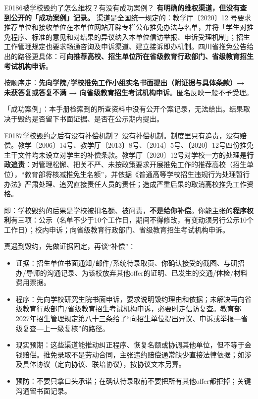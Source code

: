 \begin{qa}{E0186}{被学校毁约了怎么维权？有没有成功案例？}
\textbf{有明确的维权渠道，但没有查到公开的「成功案例」记录。}
渠道是全国统一规定的：教学厅〔2020〕12 号要求推荐单位和接收单位在本单位网站开辟专栏公布推免办法与名单，并将「学生对推免程序、标准的意见和对结果的异议纳入本单位信访举报、申诉受理机制」；招生工作管理规定也要求畅通咨询及申诉渠道、建立接诉即办机制。四川省推免公告给出的路径更具体：可\textbf{向推荐高校、招生单位所在省级教育行政部门、省级教育招生考试机构申诉}。

按顺序走：\textbf{先向学院/学校推免工作小组实名书面提出（附证据与具体条款）→ 未获答复或答复不满 → 向省级教育招生考试机构申诉}。匿名反映一般不予受理。

「成功案例」：本手册检索到的所查资料中没有公开个案记录，无法给出。结果取决于毁约是否留下书面证据、是否在公示期内提出。
\end{qa}

\begin{qa}{E0187}{学校毁约之后有没有补偿机制？}
没有补偿机制。制度里只有追责，没有赔偿。教学〔2006〕14号、教学厅〔2013〕8号、〔2014〕5号、〔2020〕12号四份推免主干文件均未设立对学生的补偿条款。教学厅〔2020〕12号对学校一方的处理是\textbf{行政追责}：对管理松懈、把关不严、未按政策要求开展推免工作的推荐高校（招生单位），“教育部将核减推免生名额”，并依据《普通高等学校招生违规行为处理暂行办法》严肃处理、追究直接责任人员的责任；造成严重后果的取消高校推免工作资格。

即：学校毁约的后果是学校被扣名额、被问责，\textbf{不是给你补偿}。你能主张的\textbf{程序权利}有三项：公示（名单不少于10个工作日，期间不得修改，有变动须另行公示10个工作日）；校内申诉；向省级教育行政部门、省级教育招生考试机构申诉。

真遇到毁约，先做证据固定，再谈“补偿”：
\begin{itemize}
  \item 证据：招生单位书面通知/邮件/系统待录取页、你确认接受的截图、与研招办/导师的沟通记录、为该校放弃其他offer的证明、已发生的交通/体检/材料费用票据。
  \item 程序：先向学校研究生院书面申诉，要求说明毁约理由和依据；未解决再向省级教育行政部门/省级教育招生考试机构申诉，必要时走信访复查。教育部2027年招生管理规定第八十三条给了“向招生单位提出异议、申诉或举报—省级复查—上一级复核”的路径。
  \item 现实预期：这些渠道能推动纠正程序、恢复名额或协调其他单位，但不等于金钱赔偿。推免录取不是劳动合同，主张违约赔偿通常缺少直接法律依据；如涉及具体协议（定向协议、联培协议），按协议文本另算。
  \item 预防：不要只拿口头承诺；在确认待录取前不要把所有其他offer都拒掉；关键沟通留书面记录。
\end{itemize}
\end{qa}

